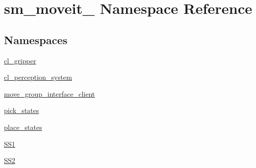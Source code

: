 \hypertarget{namespacesm__moveit__4}{}\section{sm\+\_\+moveit\+\_ Namespace Reference}
\label{namespacesm__moveit__4}
\subsection*{Namespaces}
\begin{DoxyCompactItemize}
\item 
 \hyperlink{namespacesm__moveit__4_1_1cl__gripper}{cl\+\_\+gripper}
\item 
 \hyperlink{namespacesm__moveit__4_1_1cl__perception__system}{cl\+\_\+perception\+\_\+system}
\item 
 \hyperlink{namespacesm__moveit__4_1_1move__group__interface__client}{move\+\_\+group\+\_\+interface\+\_\+client}
\item 
 \hyperlink{namespacesm__moveit__4_1_1pick__states}{pick\+\_\+states}
\item 
 \hyperlink{namespacesm__moveit__4_1_1place__states}{place\+\_\+states}
\item 
 \hyperlink{namespacesm__moveit__4_1_1SS1}{S\+S1}
\item 
 \hyperlink{namespacesm__moveit__4_1_1SS2}{S\+S2}
\end{DoxyCompactItemize}
